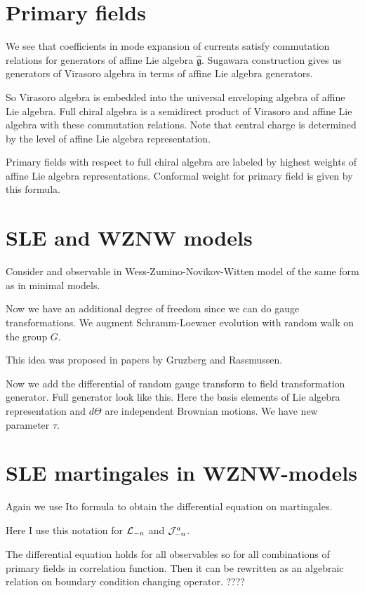 \documentclass[a4paper]{article}
\newcommand{\gfh}{\hat{\mathfrak{g}}}
\begin{document}
\section{Primary fields}
\label{sec:primary-fields}

We see that coefficients in mode expansion of currents satisfy commutation relations for generators
of affine Lie algebra $\gfh$. Sugawara construction gives us generators of Virasoro algebra in terms
of affine Lie algebra generators. 

So Virasoro algebra is embedded into the universal enveloping algebra of affine Lie algebra. 
Full chiral algebra is a semidirect product of Virasoro and affine Lie algebra with these
commutation relations. Note that central charge is determined by the level of affine Lie algebra
representation. 

Primary fields with respect to full chiral algebra are labeled by highest weights of affine Lie
algebra representations. Conformal weight for primary field is given by this formula. 

\section{SLE and WZNW models}
\label{sec:sle-wznw-models}

Consider and observable in Wess-Zumino-Novikov-Witten model of the same form as in minimal models. 

Now we have an additional degree of freedom since we can do gauge transformations. We augment
Schramm-Loewner evolution with random walk on the group $G$. 

This idea was proposed in papers by Gruzberg and Rassmussen. 

Now we add the differential of random gauge transform to field transformation generator. 
Full generator look like this. Here the basis elements of Lie algebra representation and $d \Theta$
are independent Brownian motions. We have new parameter $\tau$. 

\section{SLE martingales in WZNW-models}
\label{sec:sle-martingales-wznw}

Again we use Ito formula to obtain the differential equation on martingales. 

Here I use this notation for ${\cal L}_{-n}$ and ${\cal J}^{a}_{-n}$. 

The differential equation holds for all observables so for all combinations of primary fields in
correlation function. Then it can be rewritten as an algebraic relation on boundary condition
changing operator. ????
\end{document}

